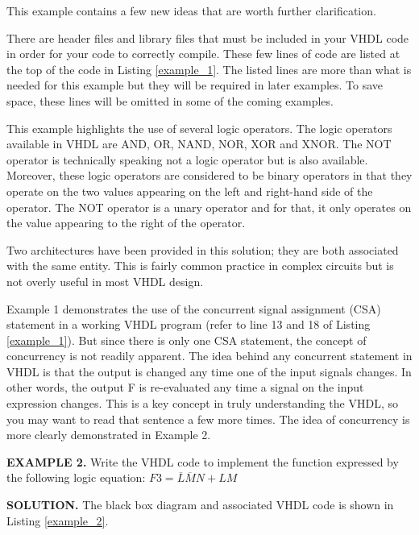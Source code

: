 This example contains a few new ideas that are worth further clarification.
\begin{my_list}
\item There are header files and library files that must be included in your VHDL code in order for your code to correctly compile. These few lines of code are listed at the top of the code in Listing \ref{example_1}. The listed lines are more than what is needed for this example but they will be required in later examples. To save space, these lines will be omitted in some of the coming examples.
\item This example highlights the use of several logic operators. The logic operators available in VHDL are AND, OR, NAND, NOR, XOR and XNOR. The NOT operator is technically speaking not a logic operator but is also available. Moreover, these logic operators are considered to be binary operators in that they operate on the two values appearing on the left and right-hand side of the operator. The NOT operator is a unary operator and for that, it only operates on the value appearing to the right of the operator.
\item Two architectures have been provided in this solution; they are both associated with the same entity. This is fairly common practice in complex circuits but is not overly useful in most VHDL design.
\end{my_list}
Example 1 demonstrates the use of the concurrent signal assignment (CSA) statement in a working VHDL program (refer to line 13 and 18 of Listing \ref{example_1}). But since there is only one CSA statement, the concept of concurrency is not readily apparent. The idea behind any concurrent statement in VHDL is that the output is changed any time one of the input signals changes. In other words, the output F is re-evaluated any time a signal on the input expression changes. This is a key concept in truly understanding the VHDL, so you may want to read that sentence a few more times. The idea of concurrency is more clearly demonstrated in Example 2.

\begin{leftbar}
\noindent
\textbf{EXAMPLE 2.}
Write the VHDL code to implement the function expressed by the following logic equation: $F3=\overline{L}\overline{M}N+LM$
\end{leftbar}
\noindent
\textbf{SOLUTION.} The black box diagram and associated VHDL code is shown in Listing \ref{example_2}.

